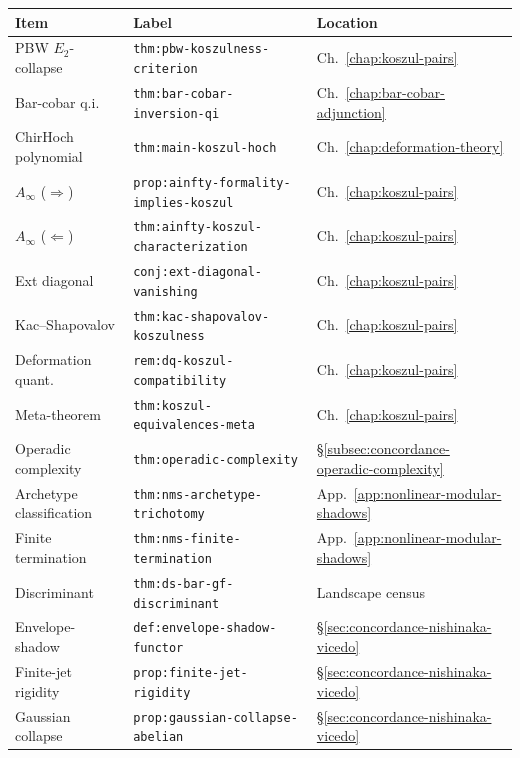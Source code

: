 \begin{center}
\renewcommand{\arraystretch}{1.15}
\begin{tabular}{@{}p{3.6cm}lp{4.5cm}@{}}
\toprule
\textbf{Item} & \textbf{Label} & \textbf{Location} \\
\midrule
PBW $E_2$-collapse
  & \texttt{thm:pbw-koszulness-criterion}
  & Ch.~\ref{chap:koszul-pairs} \\
Bar-cobar q.i.\
  & \texttt{thm:bar-cobar-inversion-qi}
  & Ch.~\ref{chap:bar-cobar-adjunction} \\
ChirHoch polynomial
  & \texttt{thm:main-koszul-hoch}
  & Ch.~\ref{chap:deformation-theory} \\
$A_\infty$ ($\Rightarrow$)
  & \texttt{prop:ainfty-formality-implies-koszul}
  & Ch.~\ref{chap:koszul-pairs} \\
$A_\infty$ ($\Leftarrow$)
  & \texttt{thm:ainfty-koszul-characterization}
  & Ch.~\ref{chap:koszul-pairs} \\
Ext diagonal
  & \texttt{conj:ext-diagonal-vanishing}
  & Ch.~\ref{chap:koszul-pairs} \\
Kac--Shapovalov
  & \texttt{thm:kac-shapovalov-koszulness}
  & Ch.~\ref{chap:koszul-pairs} \\
Deformation quant.
  & \texttt{rem:dq-koszul-compatibility}
  & Ch.~\ref{chap:koszul-pairs} \\
Meta-theorem
  & \texttt{thm:koszul-equivalences-meta}
  & Ch.~\ref{chap:koszul-pairs} \\
Operadic complexity
  & \texttt{thm:operadic-complexity}
  & \S\ref{subsec:concordance-operadic-complexity} \\
Archetype classification
  & \texttt{thm:nms-archetype-trichotomy}
  & App.~\ref{app:nonlinear-modular-shadows} \\
Finite termination
  & \texttt{thm:nms-finite-termination}
  & App.~\ref{app:nonlinear-modular-shadows} \\
Discriminant
  & \texttt{thm:ds-bar-gf-discriminant}
  & Landscape census \\
Envelope-shadow
  & \texttt{def:envelope-shadow-functor}
  & \S\ref{sec:concordance-nishinaka-vicedo} \\
Finite-jet rigidity
  & \texttt{prop:finite-jet-rigidity}
  & \S\ref{sec:concordance-nishinaka-vicedo} \\
Gaussian collapse
  & \texttt{prop:gaussian-collapse-abelian}
  & \S\ref{sec:concordance-nishinaka-vicedo} \\
\bottomrule
\end{tabular}
\end{center}


